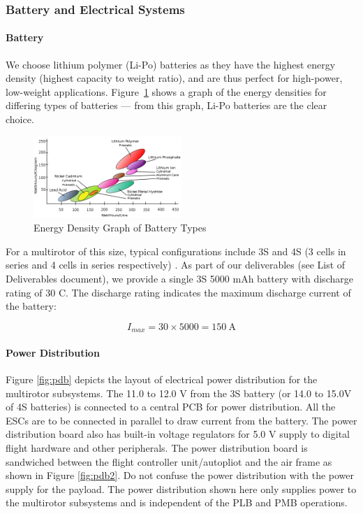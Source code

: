 \subsubsection{Battery and Electrical Systems}

\paragraph{Battery}

We choose lithium polymer (Li-Po) batteries as they have the highest energy density (highest capacity to weight ratio), and are thus  perfect for high-power, low-weight applications. Figure~\ref{fig:batterytypes} shows a graph of the energy densities for differing types of batteries \cite{battery} --- from this graph, Li-Po batteries are the clear choice.

\begin{figure}[h]
	\centering
	\includegraphics[width=0.5\textwidth]{img/energydensity.png}
	\caption{Energy Density Graph of Battery Types}
	\label{fig:batterytypes}
\end{figure}

For a multirotor of this size, typical configurations include 3S and 4S (3 cells in series and 4 cells in series respectively) . As part of our deliverables (see List of Deliverables document), we provide a single 3S 5000 mAh battery with discharge rating of 30 C. The discharge rating indicates the maximum discharge current of the battery\cite{crate}:

$$
I_{max}=30 \times 5000 = 150~\text{A}
$$

\paragraph{Power Distribution}

Figure \ref{fig:pdb} depicts the layout of electrical power distribution for the multirotor subsystems. The 11.0 to 12.0 V from the 3S battery (or 14.0 to 15.0V of 4S batteries) is connected to a central PCB for power distribution. All the ESCs are to be connected in parallel to draw current from the battery. The power distribution board also has built-in voltage regulators for 5.0 V supply to digital flight hardware and other peripherals. The power distribution board is sandwiched between the flight controller unit/autopliot and the air frame as shown in Figure \ref{fig:pdb2}. Do not confuse the power distribution with the power supply for the payload. The power distribution shown here only supplies power to the multirotor subsystems and is independent of the PLB and PMB operations.

